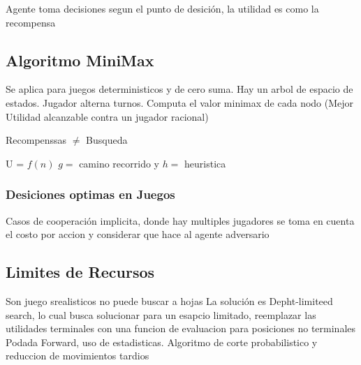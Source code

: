 Agente toma decisiones segun el punto de desición, la utilidad es como la recompensa

\subsection{Algoritmo MiniMax}
Se aplica para juegos deterministicos y de cero suma. Hay un arbol de espacio de estados. Jugador alterna turnos. Computa el valor minimax de cada nodo (Mejor Utilidad alcanzable contra un jugador racional)

Recompenssas $\neq$ Busqueda

U = $f(n)$ $g=$ camino recorrido y $h=$ heuristica

\subsubsection{Desiciones optimas en Juegos}

Casos de cooperación implicita, donde hay multiples jugadores se toma en cuenta el costo por accion y considerar que hace al agente adversario

\subsection{Limites de Recursos}
Son juego srealisticos no puede buscar a hojas
La solución es Depht-limiteed search, lo cual busca solucionar para un esapcio limitado, reemplazar las utilidades terminales con una funcion de evaluacion para posiciones no terminales
Podada Forward, uso de estadisticas. Algoritmo de corte probabilistico y reduccion de movimientos tardios
